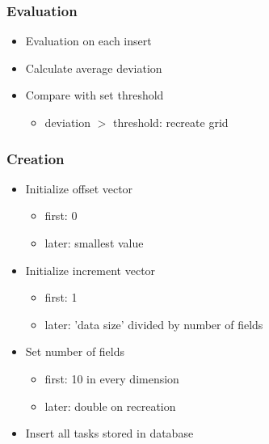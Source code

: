 \begin{frame}
	\frametitle{Evaluation}
		\begin{itemize}
			\item<2-> {Evaluation on each insert}
			\item<3-> {Calculate average deviation}
			\item<4-> {Compare with set threshold}
			\begin{itemize}
				\item<5->{deviation $>$ threshold: recreate grid}
			\end{itemize}
		\end{itemize}
\end{frame}	
	
\begin{frame}
	\frametitle{Creation}
		\begin{itemize}
			\pause
			\item{Initialize offset vector}
			\begin{itemize}
				\pause
				\item{first: 0}
				\pause
				\item{later: smallest value}
			\end{itemize}
			\pause
			\item{Initialize increment vector}
			\begin{itemize}
				\pause
				\item{first: 1}
				\pause
				\item{later: 'data size' divided by number of fields}
			\end{itemize}
			\pause
			\item{Set number of fields}			
			\begin{itemize}
				\pause
				\item{first: 10 in every dimension}
				\pause
				\item{later: double on recreation}
			\end{itemize}
			\pause
			\item{Insert all tasks stored in database}			
		\end{itemize}
\end{frame}

